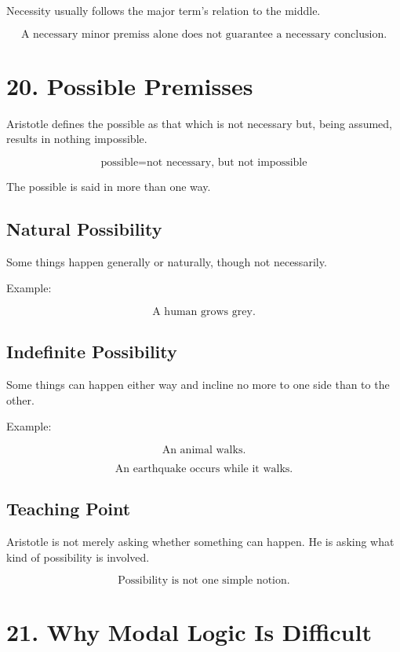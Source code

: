 \documentclass[12pt]{article}
\begin{document}
Necessity usually follows the major term's relation to the middle.

\[
\boxed{
\text{A necessary minor premiss alone does not guarantee a necessary conclusion.}
}
\]

\section*{20. Possible Premisses}

Aristotle defines the possible as that which is not necessary but, being
assumed, results in nothing impossible.

\[
\boxed{
\text{possible} = \text{not necessary, but not impossible}
}
\]

The possible is said in more than one way.

\subsection*{Natural Possibility}

Some things happen generally or naturally, though not necessarily.

Example:

\[
\text{A human grows grey.}
\]

\subsection*{Indefinite Possibility}

Some things can happen either way and incline no more to one side than to the
other.

Example:

\[
\text{An animal walks.}
\]

\[
\text{An earthquake occurs while it walks.}
\]

\subsection*{Teaching Point}

Aristotle is not merely asking whether something can happen. He is asking what
kind of possibility is involved.

\[
\boxed{
\text{Possibility is not one simple notion.}
}
\]

\section*{21. Why Modal Logic Is Difficult}
\end{document}
